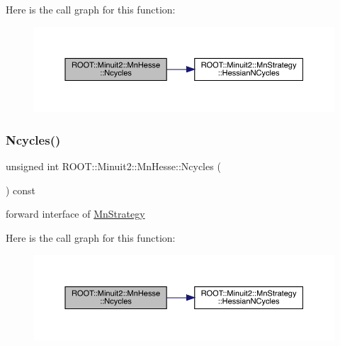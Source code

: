 Here is the call graph for this function\+:
\nopagebreak
\begin{figure}[H]
\begin{center}
\leavevmode
\includegraphics[width=350pt]{d1/d02/classROOT_1_1Minuit2_1_1MnHesse_a5a84b9459469f2edf55f28d8d579a00d_cgraph}
\end{center}
\end{figure}
\mbox{\label{classROOT_1_1Minuit2_1_1MnHesse_a5a84b9459469f2edf55f28d8d579a00d}} 
\subsubsection{\texorpdfstring{Ncycles()}{Ncycles()}\hspace{0.1cm}{\footnotesize\ttfamily [3/3]}}
{\footnotesize\ttfamily unsigned int R\+O\+O\+T\+::\+Minuit2\+::\+Mn\+Hesse\+::\+Ncycles (\begin{DoxyParamCaption}{ }\end{DoxyParamCaption}) const\hspace{0.3cm}{\ttfamily [inline]}}



forward interface of \mbox{\hyperlink{classROOT_1_1Minuit2_1_1MnStrategy}{Mn\+Strategy}} 

Here is the call graph for this function\+:
\nopagebreak
\begin{figure}[H]
\begin{center}
\leavevmode
\includegraphics[width=350pt]{d1/d02/classROOT_1_1Minuit2_1_1MnHesse_a5a84b9459469f2edf55f28d8d579a00d_cgraph}
\end{center}
\end{figure}
\mbox{\label{classROOT_1_1Minuit2_1_1MnHesse_aa0af93c1c82038bab7ffe84c198fa176}} 
